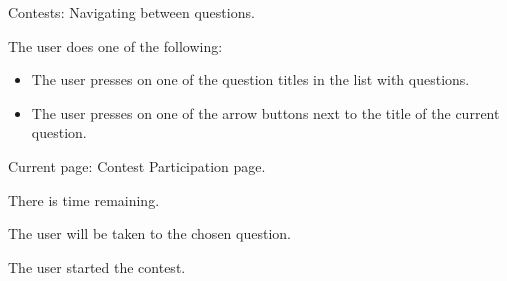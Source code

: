 \begin{uc}{Contests: Navigating between questions.}

    \begin{uc-mss}
    \item The user does one of the following:
	\begin{itemize}
		\item The user presses on one of the question titles in the list with questions.
		\item The user presses on one of the arrow buttons next to the title of the current question.
	\end{itemize}
    \end{uc-mss}

    \begin{uc-pre}
    \item Current page: Contest Participation page.
    \item There is time remaining. 
    \end{uc-pre}

    \begin{uc-post}
    \item The user will be taken to the chosen question.
    \end{uc-post}

    \begin{uc-trig}
    The user started the contest. 
    \end{uc-trig}

\end{uc}